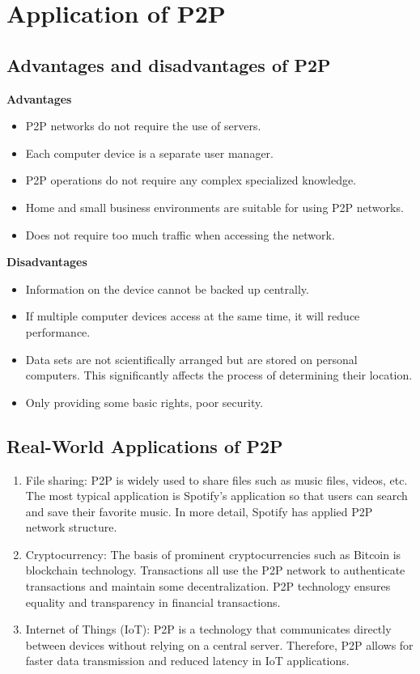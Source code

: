 \section{Application of P2P}

\subsection{Advantages and disadvantages of P2P}

\textbf{Advantages}
\begin{itemize}
    \item P2P networks do not require the use of servers.
    \item Each computer device is a separate user manager.
    \item P2P operations do not require any complex specialized knowledge.
    \item Home and small business environments are suitable for using P2P networks.
    \item Does not require too much traffic when accessing the network.
\end{itemize}

\textbf{Disadvantages}
\begin{itemize}
    \item Information on the device cannot be backed up centrally.
    \item If multiple computer devices access at the same time, it will reduce performance.
    \item Data sets are not scientifically arranged but are stored on personal computers. This significantly affects the process of determining their location.
    \item Only providing some basic rights, poor security.
\end{itemize}

\subsection{Real-World Applications of P2P}

\begin{enumerate}
    \item File sharing: P2P is widely used to share files such as music files, videos, etc. The most typical application is Spotify's application so that users can search and save their favorite music. In more detail, Spotify has applied P2P network structure.
    
    \item Cryptocurrency: The basis of prominent cryptocurrencies such as Bitcoin is blockchain technology. Transactions all use the P2P network to authenticate transactions and maintain some decentralization. P2P technology ensures equality and transparency in financial transactions.
    
    \item Internet of Things (IoT): P2P is a technology that communicates directly between devices without relying on a central server. Therefore, P2P allows for faster data transmission and reduced latency in IoT applications.
\end{enumerate}

